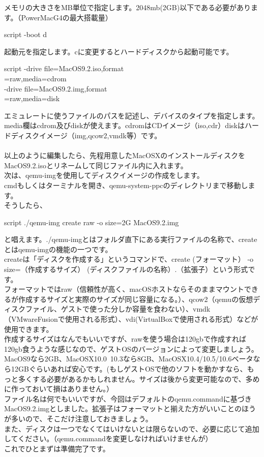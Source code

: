\documentclass[b5paper,9pt,platex,dvipdfmx]{jsarticle}
\begin{document}
\begin{multicols*}{3}
メモリの大きさをMB単位で指定します。2048mb(2GB)以下である必要があります。（PowerMacG4の最大搭載量）\\
\begin{itembox}{script}
-boot d
\end{itembox}
起動元を指定します。cに変更するとハードディスクから起動可能です。\\
\begin{itembox}{script}
-drive file=MacOS9.2.iso,format\\
=raw,media=cdrom \ \\
-drive file=MacOS9.2.img,format\\
=raw,media=disk 
\end{itembox}
エミュレートに使うファイルのパスを記述し、デバイスのタイプを指定します。\\
media欄はcdrom及びdiskが使えます。cdromはCDイメージ（iso,cdr）diskはハードディスクイメージ（img,qcow2,vmdk等）です。\\
\\
以上のように編集したら、先程用意したMacOSXのインストールディスクをMacOS9.2.isoとリネームして同じファイル内に入れます。\\
次は、qemu-imgを使用してディスクイメージの作成をします。\\
cmdもしくはターミナルを開き、qemu-system-ppcのディレクトリまで移動します。\\
そうしたら、
\begin{itembox}{script}
./qemu-img create raw -o size=2G MacOS9.2.img
\end{itembox}
と唱えます。./qemu-imgとはフォルダ直下にある実行ファイルの名称で、createとはqemu-imgの機能の一つです。\\
createは「ディスクを作成する」というコマンドで、create (フォーマット） -o size=（作成するサイズ） (ディスクファイルの名称）.（拡張子）という形式です。\\
フォーマットではraw（信頼性が高く、macOSホストならそのままマウントできるが作成するサイズと実際のサイズが同じ容量になる。）、qcow2（qemuの仮想ディスクファイル、ゲストで使った分しか容量を食わない）、vmdk（VMwareFusionで使用される形式）、vdi(VirtualBoxで使用される形式）などが使用できます。\\
作成するサイズはなんでもいいですが、rawを使う場合は120gbで作成すれば120gb食うような感じなので、ゲストOSのバージョンによって変更しましょう。\\
MacOS9なら2GB、MacOSX10.0~10.3なら8GB、MacOSX10.4/10.5/10.6ベータなら12GBぐらいあれば安心です。(もしゲストOSで他のソフトを動かすなら、もっと多くする必要があるかもしれません。サイズは後から変更可能なので、多めに作っておいて損はありません。）\\
ファイル名は何でもいいですが、今回はデフォルトのqemu.commandに基づきMacOS9.2.imgとしました。拡張子はフォーマットと揃えた方がいいことのほうが多いので、そこだけ注意しておきましょう。\\
また、ディスクは一つでなくてはいけないとは限らないので、必要に応じて追加してください。（qemu.commandを変更しなければいけませんが）\\
これでひとまずは準備完了です。\\

\end{multicols*}
\end{document}
